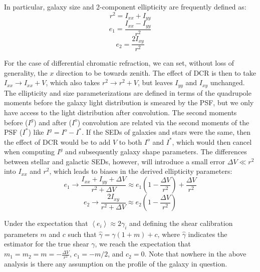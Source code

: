\documentclass[apj]{emulateapj}
\begin{document}
In particular, galaxy size and 2-component ellipticity are frequently defined as:
\begin{equation}
  r^2 = I_{xx} + I_{yy}
\end{equation}
\begin{equation}
  e_1 = \frac{I_{xx} - I_{yy}}{r^2}
\end{equation}
\begin{equation}
  e_2 = \frac{2 I_{xy}}{r^2}
\end{equation}

For the case of differential chromatic refraction, we can set, without
loss of generality, the $x$ direction to be towards zenith.  The
effect of DCR is then to take $I_{xx} \rightarrow I_{xx} + V$, which
also takes $r^2 \rightarrow r^2 + V$, but leaves $I_{yy}$ and $I_{xy}$
unchanged.  The ellipticity and size parameterizations are defined in
terms of the quadrupole moments before the galaxy light distribution
is smeared by the PSF, but we only have access to the light
distribution after convolution.  The second moments before ($I^g$) and
after ($I^o$) convolution are related via the second moments of the
PSF ($I^*$) like $I^g = I^o - I^*$.  If the SEDs of galaxies and stars
were the same, then the effect of DCR would be to add $V$ to both
$I^o$ and $I^*$, which would then cancel when computing $I^g$ and
subsequently galaxy shape parameters.  The differences between stellar
and galactic SEDs, however, will introduce a small error $\Delta V \ll
r^2$ into $I_{xx}$ and $r^2$, which leads to biases in the derived
ellipticity parameters:
\begin{equation}
  e_1 \rightarrow \frac{I_{xx} + I_{yy} + \Delta V}{r^2 + \Delta V} \approx e_1 \left(1 - \frac{\Delta V}{r^2}\right) + \frac{\Delta V}{r^2}
\end{equation}
\begin{equation}
  e_2 \rightarrow \frac{2 I_{xy}}{r^2 + \Delta V} \approx e_2 \left(1 - \frac{\Delta V}{r^2}\right)
\end{equation}

Under the expectation that $\left<e_i\right> \approx 2\gamma_i$ and
defining the shear calibration parameters $m$ and $c$ such that
$\hat{\gamma} = \gamma (1 + m) + c$, where $\hat{\gamma}$ indicates
the estimator for the true shear $\gamma$, we reach the expectation
that $m_1 = m_2 = m = -\frac{\Delta V}{r^2}$, $c_1 = -m/2$, and $c_2 =
0$.  Note that nowhere in the above analysis is there any assumption
on the profile of the galaxy in question.
\end{document}
